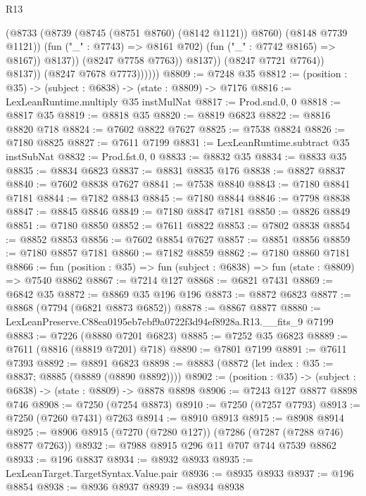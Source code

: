 \begin{lexlean}{R13}
\begin{coremodule}
                                (@8733
                                  (@8739 (@8745 (@8751 @8760) (@8142 @1121)) @8760)
                                  (@8148 @7739 @1121))
                                (fun ("_" : @7743) => @8161 @702)
                                (fun ("_" : @7742 @8165) => @8167))
                              @8137))
                          (@8247 @7758 @7763))
                        @8137))
                    (@8247 @7721 @7764))
                  @8137))
              (@8247 @7678 @7773))))))
@8809 := @7248 @35
@8812 := (position : @35) -> (subject : @6838) -> (state : @8809) -> @7176
@8816 := LexLeanRuntime.multiply @35 instMulNat
@8817 := Prod.snd.{0, 0}
@8818 := @8817 @35
@8819 := @8818 @35
@8820 := @8819 @6823
@8822 := @8816 @8820 @718
@8824 := @7602 @8822 @7627
@8825 := @7538 @8824
@8826 := @7180 @8825
@8827 := @7611 @7199
@8831 := LexLeanRuntime.subtract @35 instSubNat
@8832 := Prod.fst.{0, 0}
@8833 := @8832 @35
@8834 := @8833 @35
@8835 := @8834 @6823
@8837 := @8831 @8835 @176
@8838 := @8827 @8837
@8840 := @7602 @8838 @7627
@8841 := @7538 @8840
@8843 := @7180 @8841 @7181
@8844 := @7182 @8843
@8845 := @7180 @8844
@8846 := @7798 @8838
@8847 := @8845 @8846
@8849 := @7180 @8847 @7181
@8850 := @8826 @8849
@8851 := @7180 @8850
@8852 := @7611 @8822
@8853 := @7802 @8838
@8854 := @8852 @8853
@8856 := @7602 @8854 @7627
@8857 := @8851 @8856
@8859 := @7180 @8857 @7181
@8860 := @7182 @8859
@8862 := @7180 @8860 @7181
@8866 := fun (position : @35) => fun (subject : @6838) => fun (state : @8809) => @7540 @8862
@8867 := @7214 @127
@8868 := @6821 @7431
@8869 := @6842 @35
@8872 := @8869 @35 @196 @196
@8873 := @8872 @6823
@8877 := @8868 (@7794 (@6821 @8873 @6852))
@8878 := @8867 @8877
@8880 := LexLeanPreserve.C88ea0195eb7ebf9a0722f3d94ef8928a.R13.__fits_9 @7199
@8883 := @7226 (@8880 @7201 @6823)
@8885 := @7252 @35 @6823
@8889 := @7611 (@8816 (@8819 @7201) @718)
@8890 := @7801 @7199
@8891 := @7611 @7393
@8892 := @8891 @6823
@8898 := @8883 (@8872 (let index : @35 := @8837; @8885 (@8889 (@8890 @8892))))
@8902 := (position : @35) -> (subject : @6838) -> (state : @8809) -> @8878 @8898
@8906 := @7243 @127 @8877 @8898 @746
@8908 := @7250 (@7254 @8873)
@8910 := @7250 (@7257 @7793)
@8913 := @7250 (@7260 @7431) @7263
@8914 := @8910 @8913
@8915 := @8908 @8914
@8925 := @8906 @8915 (@7270 (@7280 @127)) (@7286 (@7287 (@7288 @746) @8877 @7263))
@8932 := @7988 @8915 @296 @11 @707 @744 @7539 @8862
@8933 := @196 @8837
@8934 := @8932 @8933
@8935 := LexLeanTarget.TargetSyntax.Value.pair
@8936 := @8935 @8933
@8937 := @196 @8854
@8938 := @8936 @8937
@8939 := @8934 @8938

\end{coremodule}
\end{lexlean}
